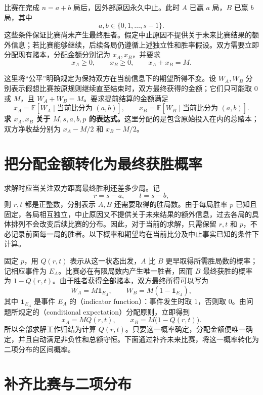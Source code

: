 \documentclass[UTF8]{ctexbook}
\begin{document}
比赛在完成 \(n=a+b\) 局后，因外部原因永久中止。此时 \(A\) 已赢 \(a\) 局，\(B\) 已赢 \(b\) 局，其中
\[
a,b\in\{0,1,\ldots,s-1\}.
\]
这些条件保证比赛尚未产生最终胜者。假定中止原因不提供关于未来比赛结果的额外信息；若比赛能够继续，后续各局仍遵循上述独立性和胜率假设。双方需要立即分配现有赌本，分配金额分别记为 \(x_A,x_B\)，并要求
\[
x_A\ge 0,\qquad x_B\ge 0,\qquad x_A+x_B=M.
\]

这里将“公平”明确规定为保持双方在当前信息下的期望所得不变。设 \(W_A,W_B\) 分别表示假想比赛按原规则继续直至结束时，双方最终获得的金额；它们只可能取 \(0\) 或 \(M\)，且 \(W_A+W_B=M\)。要求提前结算的金额满足
\[
x_A=\mathbb E[W_A\mid\text{当前比分为 }(a,b)],
\qquad
x_B=\mathbb E[W_B\mid\text{当前比分为 }(a,b)].
\]
\textbf{求 \(x_A,x_B\) 关于 \(M,s,a,b,p\) 的表达式。}这里分配的是包含原始投入在内的总赌本；双方净收益分别为 \(x_A-M/2\) 和 \(x_B-M/2\)。

\section{把分配金额转化为最终获胜概率}
\label{sec:points-reduction}

求解时应当关注双方距离最终胜利还差多少局。记
\begin{equation}
  r=s-a,\qquad t=s-b,
  \label{eq:points-remaining}
\end{equation}
则 $r,t$ 都是正整数，分别表示 $A,B$ 还需要取得的胜局数。由于每局胜率 $p$ 已知且固定，各局相互独立，中止原因又不提供关于未来结果的额外信息，过去各局的具体排列不会改变后续比赛的分布。因此，对于当前的求解，只需保留 $r,t$ 和 $p$，不必记录前面每一局的胜者。以下概率和期望均在当前比分及中止事实已知的条件下计算。

固定 $p$，用 $Q(r,t)$ 表示从这一状态出发，$A$ 比 $B$ 更早取得所需胜局数的概率；记相应事件为 $E_A$。比赛必在有限局数内产生唯一胜者，因而 $B$ 最终获胜的概率为 $1-Q(r,t)$。由于胜者获得全部赌本，双方最终所得可以写为
\[
  W_A=M\mathbf 1_{E_A},\qquad W_B=M(1-\mathbf 1_{E_A}),
\]
其中 $\mathbf 1_{E_A}$ 是事件 $E_A$ 的（indicator function）：事件发生时取 $1$，否则取 $0$。由问题所规定的（conditional expectation）分配原则，立即得到
\begin{equation}
  x_A=M Q(r,t),\qquad x_B=M\bigl(1-Q(r,t)\bigr).
  \label{eq:points-allocation}
\end{equation}
所以全部求解工作归结为计算 $Q(r,t)$。只要这一概率确定，分配金额便唯一确定，并且自动满足非负性和总额守恒。下面通过补齐未来比赛，将这一概率转化为二项分布的区间概率。

\section{补齐比赛与二项分布}
\label{sec:points-binomial}
\end{document}
